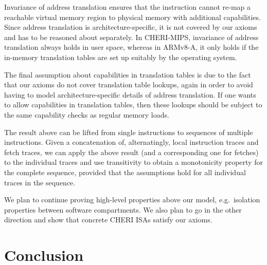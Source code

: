 \documentclass[11pt]{article}
\theoremstyle{definition}
\begin{document}
Invariance of address translation ensures that the instruction cannot re-map a
reachable virtual memory region to physical memory with additional
capabilities.  Since address translation is architecture-specific, it is not
covered by our axioms and has to be reasoned about separately.  In CHERI-MIPS,
invariance of address translation always holds in user space, whereas in
\mbox{ARMv8-A}, it only holds if the in-memory translation tables are set up suitably
by the operating system.

The final assumption about capabilities in translation tables is due to the
fact that our axioms do not cover translation table lookups, again in order to
avoid having to model architecture-specific details of address translation.  If
one wants to allow capabilities in translation tables, then these lookups
should be subject to the same capability checks as regular memory loads.

The result above can be lifted from single instructions to sequences of
multiple instructions.  Given a concatenation of, alternatingly, local
instruction traces and fetch traces, we can apply the above result (and a
corresponding one for fetches) to the individual traces and use transitivity to
obtain a monotonicity property for the complete sequence, provided that the
assumptions hold for all individual traces in the sequence.

We plan to continue proving high-level properties above our model,
e.g.~isolation properties between software compartments.  We also plan to go in
the other direction and show that concrete CHERI ISAs satisfy our axioms.

\section{Conclusion}
\end{document}
